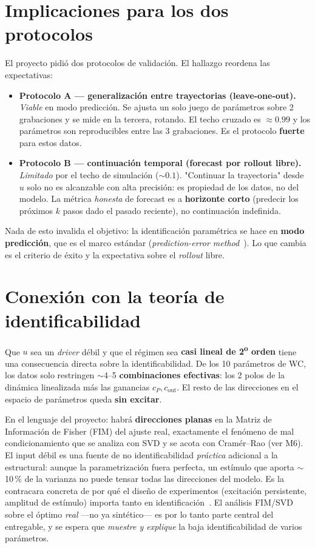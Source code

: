 \documentclass[11pt,a4paper]{article}
\begin{document}
\section{Implicaciones para los dos protocolos}
El proyecto pidió dos protocolos de validación. El hallazgo reordena las expectativas:
\begin{itemize}[leftmargin=1.4em]
  \item \textbf{Protocolo A --- generalización entre trayectorias (leave-one-out).} \emph{Viable} en modo predicción. Se ajusta un solo juego de parámetros sobre 2 grabaciones y se mide en la tercera, rotando. El techo cruzado es $\approx0.99$ y los parámetros son reproducibles entre las 3 grabaciones. Es el protocolo \textbf{fuerte} para estos datos.
  \item \textbf{Protocolo B --- continuación temporal (forecast por rollout libre).} \emph{Limitado} por el techo de simulación ($\sim0.1$). "Continuar la trayectoria" desde $u$ solo no es alcanzable con alta precisión: es propiedad de los datos, no del modelo. La métrica \emph{honesta} de forecast es a \textbf{horizonte corto} (predecir los próximos $k$ pasos dado el pasado reciente), no continuación indefinida.
\end{itemize}
Nada de esto invalida el objetivo: la identificación paramétrica se hace en \textbf{modo predicción}, que es el marco estándar (\emph{prediction-error method}~\cite{ljung}). Lo que cambia es el criterio de éxito y la expectativa sobre el \emph{rollout} libre.

\section{Conexión con la teoría de identificabilidad}
Que $u$ sea un \emph{driver} débil y que el régimen sea \textbf{casi lineal de 2\textsuperscript{o} orden} tiene una consecuencia directa sobre la identificabilidad. De los 10 parámetros de WC, los datos solo restringen $\sim$4--5 \textbf{combinaciones efectivas}: los 2 polos de la dinámica linealizada más las ganancias $c_P, c_{\text{out}}$. El resto de las direcciones en el espacio de parámetros queda \textbf{sin excitar}.

En el lenguaje del proyecto: habrá \textbf{direcciones planas} en la Matriz de Información de Fisher (FIM) del ajuste real, exactamente el fenómeno de mal condicionamiento que se analiza con SVD y se acota con Cramér--Rao (ver M6). El input débil es una fuente de no identificabilidad \emph{práctica} adicional a la estructural: aunque la parametrización fuera perfecta, un estímulo que aporta $\sim$10\,\% de la varianza no puede tensar todas las direcciones del modelo. Es la contracara concreta de por qué el diseño de experimentos (excitación persistente, amplitud de estímulo) importa tanto en identificación~\cite{ljung, raue}. El análisis FIM/SVD sobre el óptimo \emph{real} ---no ya sintético--- es por lo tanto parte central del entregable, y se espera que \emph{muestre y explique} la baja identificabilidad de varios parámetros.
\end{document}
